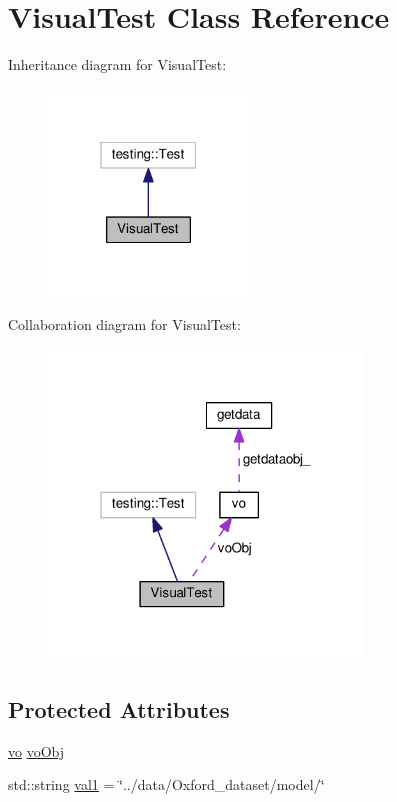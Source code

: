 \hypertarget{class_visual_test}{}\section{Visual\+Test Class Reference}
\label{class_visual_test}


Inheritance diagram for Visual\+Test\+:
\nopagebreak
\begin{figure}[H]
\begin{center}
\leavevmode
\includegraphics[width=151pt]{class_visual_test__inherit__graph}
\end{center}
\end{figure}


Collaboration diagram for Visual\+Test\+:
\nopagebreak
\begin{figure}[H]
\begin{center}
\leavevmode
\includegraphics[width=238pt]{class_visual_test__coll__graph}
\end{center}
\end{figure}
\subsection*{Protected Attributes}
\begin{DoxyCompactItemize}
\item 
\hyperlink{classvo}{vo} \hyperlink{class_visual_test_ada2ac3c1ec41626761106d66c768ee19}{vo\+Obj}
\item 
std\+::string \hyperlink{class_visual_test_add48da25b6995fd1442424f779a777d1}{val1} = \char`\"{}../data/Oxford\+\_\+dataset/model/\char`\"{}
\end{DoxyCompactItemize}


